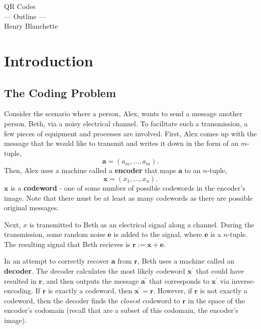 \documentclass{article}
\renewcommand{\=}{\equiv}
\newcommand{\p}{^\prime}
\renewcommand{\v}{\mathbf}
\newcommand{\x}{{\v x}}
\theoremstyle{plain}
\theoremstyle{definition}
\begin{document}
\begin{center}
  {\huge\sc QR Codes}
  \\[2em]
  {\Large --- Outline ---}
  \\[2em]
  {\large Henry Blanchette}
\end{center}

\vspace{4em}

\tableofcontents
\newpage

\section{Introduction}

\subsection{The Coding Problem}
Consider the scenario where a person, Alex, wants to send a message another person, Beth, via a noisy electrical channel.
To facilitate such a transmission, a few pieces of equipment and processes are involved.
First, Alex comes up with the message that he would like to transmit and writes it down in the form of an $m$-tuple,
$$ \v a = (a_m, \dots, a_m). $$
Then, Alex uses a machine called a \textbf{encoder} that maps $\v a$ to an $n$-tuple,
$$ \x = (x_1, \dots, x_n). $$
$\x$ is a \textbf{codeword} - one of some number of possible codewords in the encoder's image.
Note that there must be at least as many codewords as there are possible original messages.

Next, $x$ is transmitted to Beth as an electrical signal along a channel.
During the transmission, some random noise $\v e$ is added to the signal, where $\v e$ is a $n$-tuple.
The resulting signal that Beth recieves is $\v r := \x + \v e$.

In an attempt to correctly recover $\v a$ from $\v r$, Beth uses a machine called an \textbf{decoder}.
The decoder calculates the most likely codeword $\x\p$ that could have resulted in $\v r$,
and then outputs the message $\v a\p$ that corresponds to $\x\p$ via inverse-encoding.
If $\v r$ is exactly a codeword, then $\x\p = \v r$.
However, if $\v r$ is not exactly a codeword, then the decoder finds the \textit{closest} codeword to $\v r$ in the space of the encoder's codomain (recall that are a subset of this codomain, the encoder's image).
\end{document}

